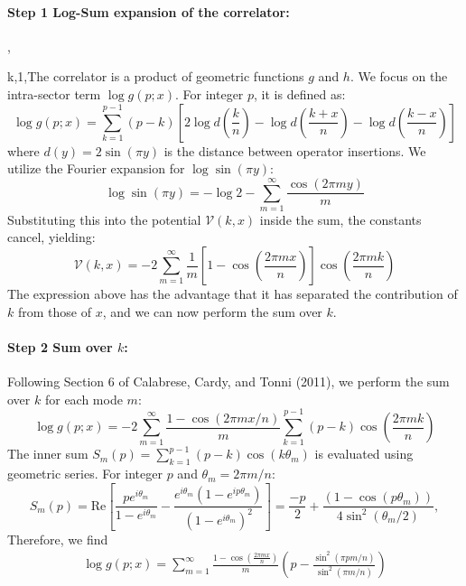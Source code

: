 \documentclass[11pt]{article}
\newcommand{\lb}{\left(}
\newcommand{\rb}{\right)}
\begin{document}
  \paragraph{Step 1 Log-Sum expansion of the correlator:}
  ,{k,1,The correlator is a product of geometric functions $g$ and $h$. We focus
  on the intra-sector term $\log g(p;x)$. For integer $p$, it is defined as:
  \begin{equation}
    \log g(p;x) = \sum_{k=1}^{p-1}(p-k) \left[ 2 \log d\left(\frac{k}{n}\right) -
    \log d\left(\frac{k+x}{n}\right) - \log d\left(\frac{k-x}{n}\right) \right]
  \end{equation}
  where $d(y) = 2\sin(\pi y)$ is the distance between operator insertions. We
  utilize the Fourier expansion for $\log \sin(\pi y)$:
  \begin{equation}
    \log \sin(\pi y) = -\log 2 - \sum_{m=1}^{\infty}\frac{\cos(2\pi m y)}{m}
  \end{equation}
  Substituting this into the potential $\mathcal{V}(k,x)$ inside the sum, the
  constants cancel, yielding:
  \begin{equation}
    \mathcal{V}(k,x) = -2 \sum_{m=1}^{\infty}\frac{1}{m}\left[ 1 - \cos\left(\frac{2\pi
    m x}{n}\right) \right] \cos\left(\frac{2\pi m k}{n}\right)
  \end{equation}
  The expression above has the advantage that it has separated the contribution
  of $k$ from those of $x$, and we can now perform the sum over $k$.

  \paragraph{Step 2 Sum over $k$:}
  Following Section 6 of Calabrese, Cardy, and Tonni (2011), we perform the sum over
  $k$ for each mode $m$:
  \begin{equation}
    \log g(p;x) = -2 \sum_{m=1}^{\infty}\frac{1 - \cos(2\pi m x/n)}{m}\sum_{k=1}^{p-1}
    (p-k) \cos\left(\frac{2\pi m k}{n}\right)
  \end{equation}
  The inner sum $S_{m}(p) = \sum_{k=1}^{p-1}(p-k) \cos(k\theta_{m})$ is
  evaluated using geometric series. For integer $p$ and $\theta_{m}=2\pi m/n$:
  \begin{equation}
    S_{m}(p) = \text{Re}\left[ \frac{p e^{i\theta_m}}{1-e^{i\theta_m}}- \frac{e^{i\theta_m}(1-e^{ip\theta_m})}{(1-e^{i\theta_m})^{2}}
    \right]=\frac{-p}{2}+\frac{(1-\cos(p\theta_{m}))}{4\sin^{2}(\theta_{m}/2)},
  \end{equation}
  Therefore, we find
  \begin{eqnarray}
    \log g(p;x)=\sum_{m=1}^\infty \frac{1-\cos(\frac{2\pi m x}{n})}{m}\lb p-\frac{\sin^{2}(\pi
    p m/n)}{\sin^{2}(\pi m/n)}\rb
  \end{eqnarray}

}
\end{document}
